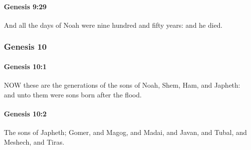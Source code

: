 		\paragraph{Genesis 9:29} %
			\label{GENESIS-9-29}

			And all the days of Noah were nine hundred and fifty years: and he died.


	\subsubsection{Genesis 10} %
		\label{GENESIS-10}
		
		\paragraph{Genesis 10:1} %
			\label{GENESIS-10-1}

			NOW these are the generations of the sons of Noah, Shem, Ham, and Japheth: and unto them were sons born after the flood.


		\paragraph{Genesis 10:2} %
			\label{GENESIS-10-2}

			The sons of Japheth; Gomer, and Magog, and Madai, and Javan, and Tubal, and Meshech, and Tiras.


